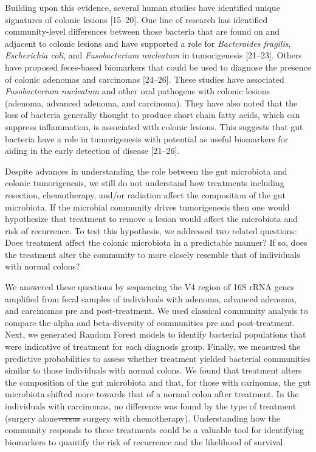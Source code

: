 \documentclass[12pt,]{article}
\providecommand{\DIFaddtex}[1]{{\protect\color{blue}\uwave{#1}}} %
\providecommand{\DIFdeltex}[1]{{\protect\color{red}\sout{#1}}}                      %
\providecommand{\DIFaddbegin}{} %
\providecommand{\DIFaddend}{} %
\providecommand{\DIFdelbegin}{} %
\providecommand{\DIFdelend}{} %
\providecommand{\DIFadd}[1]{\texorpdfstring{\DIFaddtex{#1}}{#1}} %
\providecommand{\DIFdel}[1]{\texorpdfstring{\DIFdeltex{#1}}{}} %
\begin{document}
Building upon this evidence, several human studies have identified
unique signatures of colonic lesions {[}15--20{]}. One line of research
has identified community-level differences between those bacteria that
are found on and adjacent to colonic lesions and have supported a role
for \emph{Bacteroides fragilis}, \emph{Escherichia coli}, and
\emph{Fusobacterium nucleatum} in tumorigenesis {[}21--23{]}. Others
have proposed feces-based biomarkers that could be used to diagnose the
presence of colonic adenomas and carcinomas {[}24--26{]}. These studies
have associated \emph{Fusobacterium nucleatum} and other oral pathogens
with colonic lesions (adenoma, advanced adenoma, and carcinoma). They
have also noted that the loss of bacteria generally thought to produce
short chain fatty acids, which can suppress inflammation, is associated
with colonic lesions. This suggests that gut bacteria have a role in
tumorigenesis with potential as useful biomarkers for aiding in the
early detection of disease {[}21--26{]}.

Despite advances in understanding the role between the gut microbiota
and colonic tumorigenesis, we still do not understand how treatments
including resection, chemotherapy, and/or radiation affect the
composition of the gut microbiota. If the microbial community drives
tumorigenesis then one would hypothesize that treatment to remove a
lesion would affect the microbiota and risk of recurrence. To test this
hypothesis, we addressed two related questions: Does treatment affect
the colonic microbiota in a predictable manner? If so, does the
treatment alter the community to more closely resemble that of
individuals with normal colons?

We answered these questions by sequencing the V4 region of 16S rRNA
genes amplified from fecal samples of individuals with adenoma, advanced
adenoma, and carcinomas pre and post-treatment. We used classical
community analysis to compare the alpha and beta-diversity of
communities pre and post-treatment. Next, we generated Random Forest
models to identify bacterial populations that were indicative of
treatment for each diagnosis group. Finally, we measured the predictive
probabilities to assess whether treatment yielded bacterial communities
similar to those individuals with normal colons. We found that treatment
alters the composition of the gut microbiota and that, for those with
carinomas, the gut microbiota shifted more towards that of a normal
colon after treatment. In the individuals with carcinomas, no difference
was found by the type of treatment (surgery alone\DIFdelbegin \DIFdel{versus }\DIFdelend \DIFaddbegin \DIFadd{, }\DIFaddend surgery with
chemotherapy\DIFaddbegin \DIFadd{, surgery with chemotherapy and radiation}\DIFaddend ). Understanding
how the community responds to these treatments could be a valuable tool
for identifying biomarkers to quantify the risk of recurrence and the
likelihood of survival.
\end{document}
